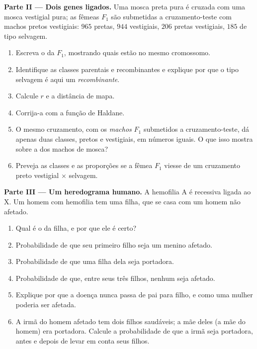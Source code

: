 \begin{problem}
\medskip
\noindent\textbf{Parte II --- Dois genes ligados.}
Uma mosca preta pura é cruzada com uma mosca vestigial pura; as fêmeas
$F_1$ são submetidas a cruzamento-teste com machos pretos vestigiais:
$965$ pretas, $944$ vestigiais, $206$ pretas vestigiais, $185$ de tipo
selvagem.
\begin{enumerate}[resume]
  \item Escreva o  da $F_1$, mostrando quais  estão no
        mesmo cromossomo.
  \item Identifique as classes parentais e recombinantes e explique
        por que o tipo selvagem é aqui um \emph{recombinante}.
  \item Calcule $r$ e a distância de mapa.
  \item Corrija-a com a função de Haldane.
  \item O mesmo cruzamento, com os \emph{machos} $F_1$ submetidos a
        cruzamento-teste, dá apenas duas classes, pretos e vestigiais,
        em números iguais. O que isso mostra sobre a  dos machos
        de mosca?
  \item Preveja as classes e as proporções se a fêmea $F_1$ viesse de
        um cruzamento preto vestigial $\times$ selvagem.
\end{enumerate}

\medskip
\noindent\textbf{Parte III --- Um heredograma humano.}
A hemofilia A é recessiva ligada ao X. Um homem com hemofilia tem uma
filha, que se casa com um homem não afetado.
\begin{enumerate}[resume]
  \item Qual é o  da filha, e por que ele é certo?
  \item Probabilidade de que seu primeiro filho seja um menino afetado.
  \item Probabilidade de que uma filha dela seja portadora.
  \item Probabilidade de que, entre seus três filhos, nenhum seja
        afetado.
  \item Explique por que a doença nunca passa de pai para filho, e
        como uma mulher poderia ser afetada.
  \item A irmã do homem afetado tem dois filhos saudáveis; a mãe deles
        (a mãe do homem) era portadora. Calcule a probabilidade de que a
        irmã seja portadora, antes e depois de levar em conta seus
        filhos.
\end{enumerate}


\end{problem}
